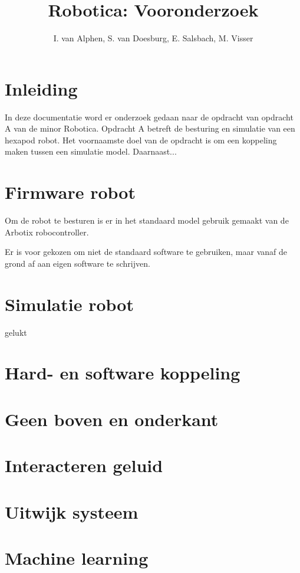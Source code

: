 \documentclass[10pt,a4paper]{article}
\title{Robotica: Vooronderzoek}
\author{I. van Alphen, S. van Doesburg, E.  Salsbach, M. Visser}
\begin{document}
\maketitle

\section{Inleiding}
In deze documentatie word er onderzoek gedaan naar de opdracht van opdracht A van de minor Robotica. Opdracht A betreft de besturing en simulatie van een hexapod robot. Het voornaamste doel van de opdracht is om een koppeling maken tussen een simulatie model. Daarnaast...

\section{Firmware robot}
Om de robot te besturen is er in het standaard model gebruik gemaakt van de Arbotix robocontroller. 

Er is voor gekozen om niet de standaard software te gebruiken, maar vanaf de grond af aan eigen software te schrijven.

\section{Simulatie robot}
gelukt

\section{Hard- en software koppeling}


\section{Geen boven en onderkant}

\section{Interacteren geluid}

\section{Uitwijk systeem}

\section{Machine learning}
\end{document}
